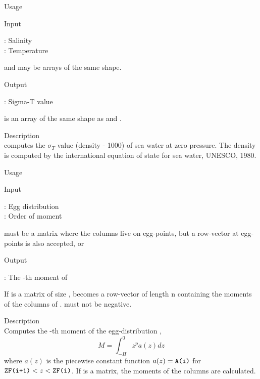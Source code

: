 {\parindent=0pt



\begin{tdesc}
\item[Usage] 
\item[Input]
  \begin{vartab}
      \> : \> Salinity     \>   [psu]   \\
      \> : \> Temperature  \>   [\degC] 
  \end{vartab}
   and  may be arrays of the same shape.
\item[Output]
  \begin{vartab}
     \> : \> Sigma-T value \>  [\kgpcum] 
  \end{vartab}
   is an array of the same shape as  and .
\item[Description] \mbox{}\\
   computes the $\sigma_T$ value (density - 1000)
  of sea water at zero pressure.
  The density is computed by the international equation
  of state for sea water, UNESCO, 1980.
\end{tdesc}



\begin{tdesc}
\item[Usage] 
\item[Input]
  \begin{vartab}
     \> : \> Egg distribution \>  [eggs/m$^3$] \\
     \> : \> Order of moment  
  \end{vartab}
   must be a matrix where the columns live on egg-points,
  but a row-vector at egg-points is also accepted,
   or 
\item[Output]
  \begin{vartab}
    \>  : \> The -th moment of  \> [eggs m$^{p-2}$]
  \end{vartab}
  If  is a matrix of size ,  becomes a 
  row-vector of length n containing the moments of
  the columns of .  must not be negative.
\item[Description]\mbox{}\\
  Computes the -th moment of the egg-distribution ,
  \begin{displaymath}
      M = \int^0_{-H} z^p a(z) dz
  \end{displaymath}
   where $a(z)$ is the piecewise constant function 
   $a(z) = {\mbox{\texttt{A(i)}}}$ for ${\mbox{\texttt{ZF(i+1)}}} < z < {\mbox{\texttt{ZF(i)}}}$.
   If  is a matrix, the moments of the columns are
   calculated.
\end{tdesc}


}

